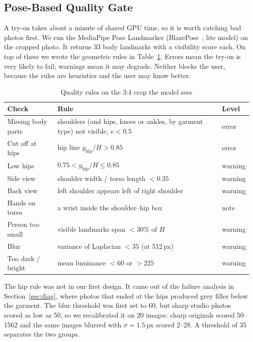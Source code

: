 \documentclass{article}
\begin{document}
\subsection{Pose-Based Quality Gate}

A try-on takes about a minute of shared GPU time, so it is worth catching bad photos first. We run the
MediaPipe Pose Landmarker (BlazePose~\cite{blazepose}, lite model) on the cropped photo. It returns 33
body landmarks with a visibility score each. On top of these we wrote the geometric rules in
Table~\ref{tab:rules}. Errors mean the try-on is very likely to fail; warnings mean it may degrade.
Neither blocks the user, because the rules are heuristics and the user may know better.

\begin{table}[t]
\caption{Quality rules on the 3:4 crop the model sees}
\label{tab:rules}
\centering
\setlength{\tabcolsep}{4pt}
\begin{tabular}{@{}>{\raggedright\arraybackslash}p{3.3cm}>{\raggedright\arraybackslash}p{7.6cm}l@{}}
\toprule
Check & Rule & Level\\
\midrule
Missing body parts & shoulders (and hips, knees or ankles, by garment type) not visible, $v<0.5$ & error\\
Cut off at hips & hip line $y_\text{hip}/H > 0.85$ & error\\
Low hips & $0.75 < y_\text{hip}/H \le 0.85$ & warning\\
Side view & shoulder width / torso length $< 0.35$ & warning\\
Back view & left shoulder appears left of right shoulder & warning\\
Hands on torso & a wrist inside the shoulder--hip box & note\\
Person too small & visible landmarks span $<30\%$ of $H$ & warning\\
Blur & variance of Laplacian $<35$ (at 512\,px) & warning\\
Too dark / bright & mean luminance $<60$ or $>225$ & warning\\
\bottomrule
\end{tabular}
\end{table}

The hip rule was not in our first design. It came out of the failure analysis in
Section~\ref{sec:diag}, where photos that ended at the hips produced grey filler below the garment.
The blur threshold was first set to 60, but sharp studio photos scored as low as 50, so we recalibrated
it on 20 images: sharp originals scored 50--1562 and the same images blurred with $\sigma=1.5$\,px scored
2--28. A threshold of 35 separates the two groups.
\end{document}
